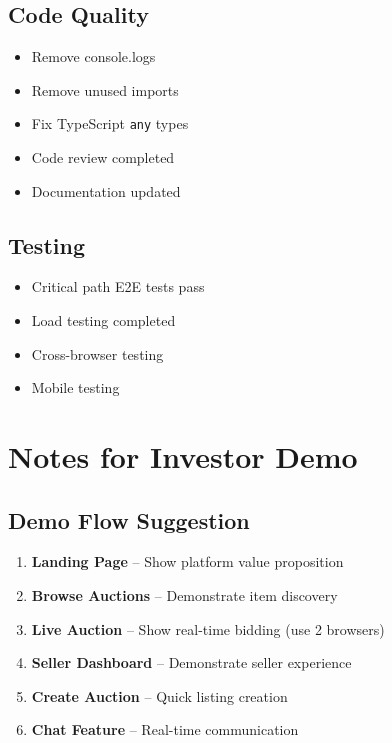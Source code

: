 \documentclass[12pt,a4paper]{article}
\begin{document}
\subsection{Code Quality}

\begin{itemize}[label=$\square$]
    \item Remove console.logs
    \item Remove unused imports
    \item Fix TypeScript \texttt{any} types
    \item Code review completed
    \item Documentation updated
\end{itemize}

\subsection{Testing}

\begin{itemize}[label=$\square$]
    \item Critical path E2E tests pass
    \item Load testing completed
    \item Cross-browser testing
    \item Mobile testing
\end{itemize}

\section{Notes for Investor Demo}

\subsection{Demo Flow Suggestion}

\begin{enumerate}
    \item \textbf{Landing Page} -- Show platform value proposition
    \item \textbf{Browse Auctions} -- Demonstrate item discovery
    \item \textbf{Live Auction} -- Show real-time bidding (use 2 browsers)
    \item \textbf{Seller Dashboard} -- Demonstrate seller experience
    \item \textbf{Create Auction} -- Quick listing creation
    \item \textbf{Chat Feature} -- Real-time communication
\end{enumerate}
\end{document}
